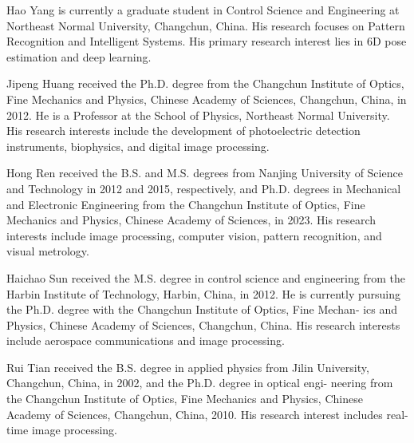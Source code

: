 \documentclass[a4paper,fleqn]{cas-sc}
\begin{document}
\printcredits





Hao Yang is currently a graduate student in Control Science and Engineering at Northeast Normal University, Changchun, China. His research focuses on Pattern Recognition and Intelligent Systems. His primary research interest lies in 6D pose estimation and deep learning.
\endbio

\vskip6pc

Jipeng Huang received the Ph.D. degree from the Changchun Institute of Optics, Fine Mechanics and Physics, Chinese Academy of Sciences, Changchun, China, in 2012. He is a Professor at the School of Physics, Northeast Normal University. His research interests include the development of photoelectric detection instruments, biophysics, and digital image processing.

\endbio


\vskip6pc

Hong Ren received the B.S. and M.S. degrees from Nanjing University of Science and Technology in 2012 and 2015, respectively, and Ph.D. degrees in Mechanical and Electronic Engineering from the Changchun Institute of Optics, Fine Mechanics and Physics, Chinese Academy of Sciences, in 2023. His research interests include image processing, computer vision, pattern recognition, and visual metrology.

\endbio


\vskip6pc

Haichao Sun received the M.S. degree in
control science and engineering from the Harbin
Institute of Technology, Harbin, China, in 2012.
He is currently pursuing the Ph.D. degree with
the Changchun Institute of Optics, Fine Mechan-
ics and Physics, Chinese Academy of Sciences,
Changchun, China. His research interests include
aerospace communications and image processing.

\endbio

\vskip6pc
Rui Tian received the B.S. degree in applied
physics from Jilin University, Changchun, China,
in 2002, and the Ph.D. degree in optical engi-
neering from the Changchun Institute of Optics,
Fine Mechanics and Physics, Chinese Academy of
Sciences, Changchun, China, 2010. His research
interest includes real-time image processing.

\endbio
\end{document}
